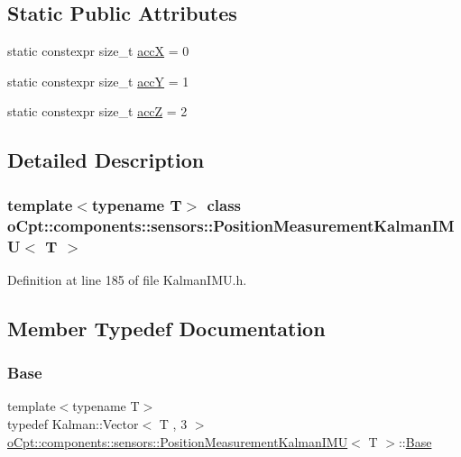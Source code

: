 \subsection*{Static Public Attributes}
\begin{DoxyCompactItemize}
\item 
static constexpr size\+\_\+t \hyperlink{classo_cpt_1_1components_1_1sensors_1_1_position_measurement_kalman_i_m_u_abe279287f350be4995f13f72c673625a}{accX} = 0
\item 
static constexpr size\+\_\+t \hyperlink{classo_cpt_1_1components_1_1sensors_1_1_position_measurement_kalman_i_m_u_aacd79fa1a1072b859caa23872affe32c}{accY} = 1
\item 
static constexpr size\+\_\+t \hyperlink{classo_cpt_1_1components_1_1sensors_1_1_position_measurement_kalman_i_m_u_a5d488a90f440b0c0b6a005ec220d88f6}{accZ} = 2
\end{DoxyCompactItemize}


\subsection{Detailed Description}
\subsubsection*{template$<$typename T$>$\newline
class o\+Cpt\+::components\+::sensors\+::\+Position\+Measurement\+Kalman\+I\+M\+U$<$ T $>$}



Definition at line 185 of file Kalman\+I\+M\+U.\+h.



\subsection{Member Typedef Documentation}
\hypertarget{classo_cpt_1_1components_1_1sensors_1_1_position_measurement_kalman_i_m_u_a1ffa7980ab41c0fffeee43e28284b1cd}{}\label{classo_cpt_1_1components_1_1sensors_1_1_position_measurement_kalman_i_m_u_a1ffa7980ab41c0fffeee43e28284b1cd} 
\subsubsection{\texorpdfstring{Base}{Base}}
{\footnotesize\ttfamily template$<$typename T$>$ \\
typedef Kalman\+::\+Vector$<$ T , 3 $>$ \hyperlink{classo_cpt_1_1components_1_1sensors_1_1_position_measurement_kalman_i_m_u}{o\+Cpt\+::components\+::sensors\+::\+Position\+Measurement\+Kalman\+I\+MU}$<$ T $>$\+::\hyperlink{classo_cpt_1_1components_1_1sensors_1_1_position_measurement_kalman_i_m_u_a1ffa7980ab41c0fffeee43e28284b1cd}{Base}}



